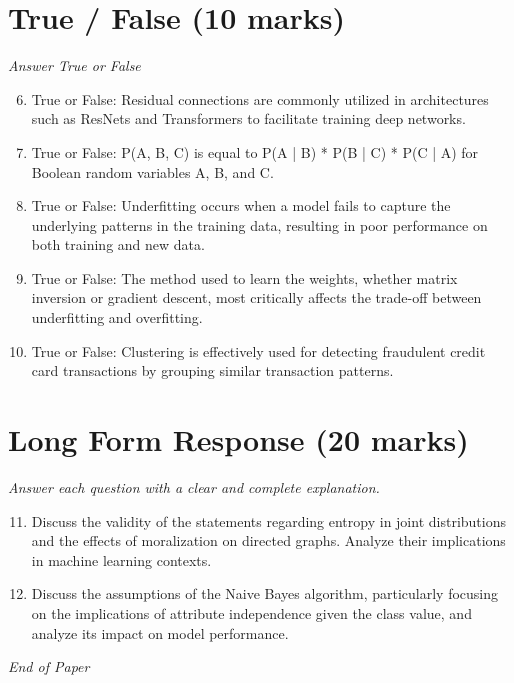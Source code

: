 \documentclass[12pt]{article}
\begin{document}
\section*{True / False (10 marks)}
\textit{Answer True or False}
\begin{enumerate}[label=\arabic*.]
\setcounter{enumi}{5}
\item True or False: Residual connections are commonly utilized in architectures such as ResNets and Transformers to facilitate training deep networks.
\item True or False: P(A, B, C) is equal to P(A | B) * P(B | C) * P(C | A) for Boolean random variables A, B, and C.
\item True or False: Underfitting occurs when a model fails to capture the underlying patterns in the training data, resulting in poor performance on both training and new data.
\item True or False: The method used to learn the weights, whether matrix inversion or gradient descent, most critically affects the trade-off between underfitting and overfitting.
\item True or False: Clustering is effectively used for detecting fraudulent credit card transactions by grouping similar transaction patterns.
\end{enumerate}

\section*{Long Form Response (20 marks)}
\textit{Answer each question with a clear and complete explanation.}
\begin{enumerate}[label=\arabic*.]
\setcounter{enumi}{10}
\item Discuss the validity of the statements regarding entropy in joint distributions and the effects of moralization on directed graphs. Analyze their implications in machine learning contexts.
\item Discuss the assumptions of the Naive Bayes algorithm, particularly focusing on the implications of attribute independence given the class value, and analyze its impact on model performance.
\end{enumerate}

\vfill
\noindent\textit{End of Paper}
\end{document}
